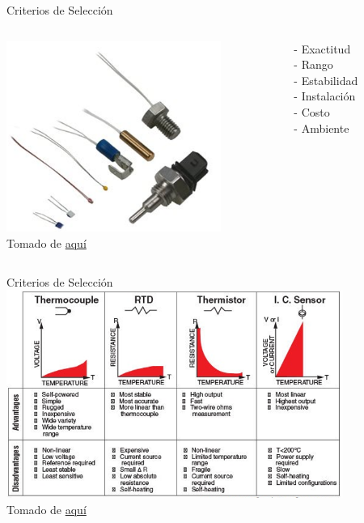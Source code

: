 \documentclass[aspectratio=169]{beamer}
\begin{document}
\begin{frame}{Criterios de Selección}

 \begin{columns}[c, onlytextwidth]
        \begin{column}{0.40\textwidth}
        \centering
            \includegraphics[width=7cm]{fig/Criteria Sensor.PNG}
            \\ \tiny{Tomado de \href{https://www.variohm.com/news-media/technical-blog-archive/selecting-temperature-sensor-things-to-consider}{aquí}}
        \end{column}
        \begin{column}{0.50\textwidth}
               \centering
        {- Exactitud \\
        - Rango \\
        - Estabilidad \\
        - Instalación\\
        - Costo\\
        - Ambiente
        }
        \end{column}
    \end{columns}


\end{frame}

\begin{frame}{Criterios de Selección}
    \centering
    \includegraphics[width=11cm]{fig/Selection_Sensor.PNG}
            \\ \tiny{Tomado de \href{https://www.mechaterrain.com/lm35-temperature-sensor}{aquí}}
\end{frame}
\end{document}
